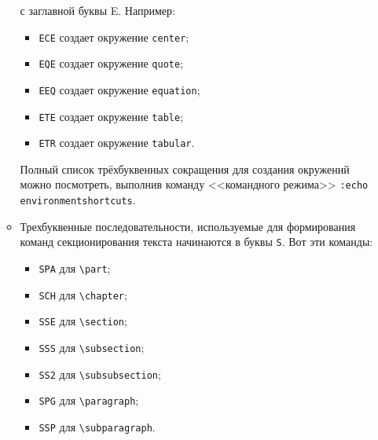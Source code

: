 \documentclass[a4paper]{article}
\begin{document}
\begin{itemize}
\begin{itemize}
				с заглавной буквы E. Например:
			  \begin{itemize}
				  \item \texttt{ECE} создает окружение \verb|center|;
				  \item \texttt{EQE} создает окружение \verb|quote|;
				  \item \texttt{EEQ} создает окружение \verb|equation|;
				  \item \texttt{ETE} создает окружение \verb|table|;
				  \item \texttt{ETR} создает окружение \verb|tabular|.
			  \end{itemize}
			  Полный список трёхбуквенных сокращения для создания окружений можно посмотреть, 
			  выполнив команду <<командного режима>> \verb|:echo environmentshortcuts|.
		  \item Трехбуквенные последовательности, используемые для формирования команд
		секционирования текста начинаются в буквы \texttt{S}. Вот эти команды:
				\begin{itemize}
					\item \texttt{SPA} для \verb|\part|;
					\item \texttt{SCH} для \verb|\chapter|;
					\item \texttt{SSE} для \verb|\section|;
					\item \texttt{SSS} для \verb|\subsection|;
					\item \texttt{SS2} для \verb|\subsubsection|;
					\item \texttt{SPG} для \verb|\paragraph|;
					\item \texttt{SSP} для \verb|\subparagraph|.

\end{itemize}
\end{itemize}
\end{itemize}
\end{document}
